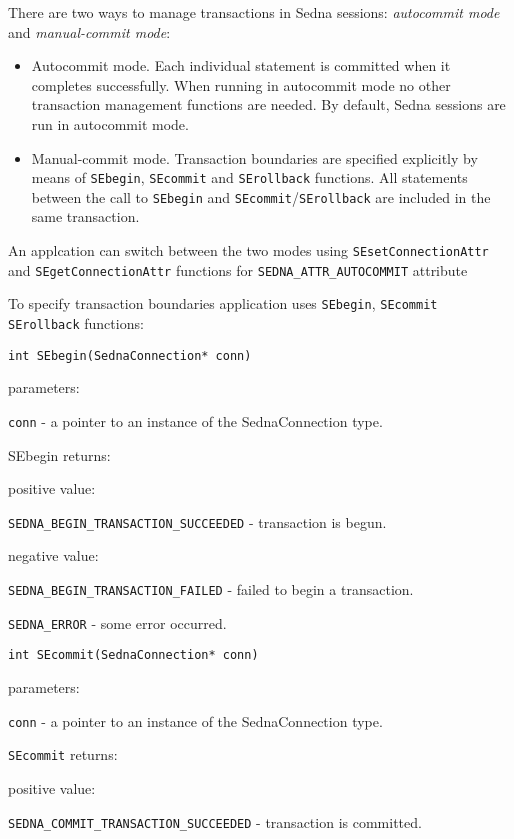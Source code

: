 \documentclass[a4paper,12pt]{article}
\begin{document}
There are two ways to manage transactions in Sedna sessions: \emph{autocommit mode} and \emph{manual-commit mode}:
\begin{itemize}
\item Autocommit mode. Each individual statement is committed when it completes successfully. When running in autocommit mode no other transaction management functions are needed. By default, Sedna sessions are run in autocommit mode.
\item Manual-commit mode. Transaction boundaries are specified explicitly by means of \verb!SEbegin!, \verb!SEcommit! and \verb!SErollback! functions. All statements between the call to \verb!SEbegin! and \verb!SEcommit!/\verb!SErollback! are included in the same transaction.
\end{itemize}

An applcation can switch between the two modes using \verb!SEsetConnectionAttr! and \verb!SEgetConnectionAttr! functions for \verb!SEDNA_ATTR_AUTOCOMMIT! attribute

To specify transaction boundaries application uses \verb!SEbegin!, \verb!SEcommit! \verb!SErollback! functions:

\begin{verbatim}int SEbegin(SednaConnection* conn)\end{verbatim}

parameters:

\verb!conn! - a pointer to an instance of the SednaConnection type.

SEbegin returns:

positive value:

\verb!SEDNA_BEGIN_TRANSACTION_SUCCEEDED! - transaction is begun.

negative value:

\verb!SEDNA_BEGIN_TRANSACTION_FAILED! - failed to begin a transaction.

\verb!SEDNA_ERROR! - some error occurred.

\begin{verbatim}int SEcommit(SednaConnection* conn)\end{verbatim}

parameters:

\verb!conn! - a pointer to an instance of the SednaConnection type.

\verb!SEcommit! returns:

positive value:

\verb!SEDNA_COMMIT_TRANSACTION_SUCCEEDED! - transaction is committed.
\end{document}
